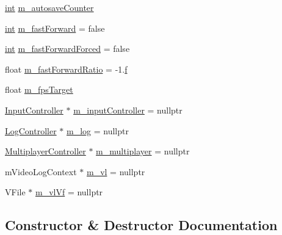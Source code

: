 \begin{DoxyCompactItemize}
\item 
\mbox{\hyperlink{ioapi_8h_a787fa3cf048117ba7123753c1e74fcd6}{int}} \mbox{\hyperlink{class_q_g_b_a_1_1_core_controller_a2f7f2cc90ff27a1b4a9bb70b55de0821}{m\+\_\+autosave\+Counter}}
\item 
\mbox{\hyperlink{ioapi_8h_a787fa3cf048117ba7123753c1e74fcd6}{int}} \mbox{\hyperlink{class_q_g_b_a_1_1_core_controller_a21da98321e1f606f42475a91d3014bd2}{m\+\_\+fast\+Forward}} = false
\item 
\mbox{\hyperlink{ioapi_8h_a787fa3cf048117ba7123753c1e74fcd6}{int}} \mbox{\hyperlink{class_q_g_b_a_1_1_core_controller_ae307cb98ba50e66cc57c86eb74e7ba6e}{m\+\_\+fast\+Forward\+Forced}} = false
\item 
float \mbox{\hyperlink{class_q_g_b_a_1_1_core_controller_ab530130955b31a2eae034b53630d27c9}{m\+\_\+fast\+Forward\+Ratio}} = -\/1.\mbox{\hyperlink{isa-arm_8c_a362077c979b0bb65159c603270e40f70}{f}}
\item 
float \mbox{\hyperlink{class_q_g_b_a_1_1_core_controller_ab3be2b29426609b72334acb8a8d51839}{m\+\_\+fps\+Target}}
\item 
\mbox{\hyperlink{class_q_g_b_a_1_1_input_controller}{Input\+Controller}} $\ast$ \mbox{\hyperlink{class_q_g_b_a_1_1_core_controller_afcbbf76a52ffbc031066c86b612fff50}{m\+\_\+input\+Controller}} = nullptr
\item 
\mbox{\hyperlink{class_q_g_b_a_1_1_log_controller}{Log\+Controller}} $\ast$ \mbox{\hyperlink{class_q_g_b_a_1_1_core_controller_a8496e6e7f2332ce09d8e20309bb483bb}{m\+\_\+log}} = nullptr
\item 
\mbox{\hyperlink{class_q_g_b_a_1_1_multiplayer_controller}{Multiplayer\+Controller}} $\ast$ \mbox{\hyperlink{class_q_g_b_a_1_1_core_controller_ae2bfc998f01f82e2bcfbb0bb14d8ca71}{m\+\_\+multiplayer}} = nullptr
\item 
m\+Video\+Log\+Context $\ast$ \mbox{\hyperlink{class_q_g_b_a_1_1_core_controller_a58925b50e5f11e483b1f8d2885a13f33}{m\+\_\+vl}} = nullptr
\item 
V\+File $\ast$ \mbox{\hyperlink{class_q_g_b_a_1_1_core_controller_a606cb4734f97b0928db606b88c8eb3a2}{m\+\_\+vl\+Vf}} = nullptr
\end{DoxyCompactItemize}


\subsection{Constructor \& Destructor Documentation}
\mbox{\label{class_q_g_b_a_1_1_core_controller_a6e4a1c279b76e4693ee7860c2cf9f2ed}} 
